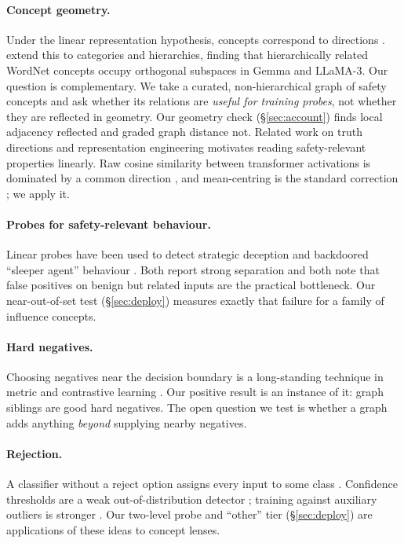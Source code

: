 \documentclass[11pt]{article}
\begin{document}
\paragraph{Concept geometry.} Under the linear representation hypothesis, concepts correspond to directions
\citep{park2024linear}. \citet{park2025hierarchical} extend this to categories and hierarchies, finding that
hierarchically related WordNet concepts occupy orthogonal subspaces in Gemma and LLaMA-3. Our question is
complementary. We take a curated, non-hierarchical graph of safety concepts and ask whether its relations are
\emph{useful for training probes}, not whether they are reflected in geometry. Our geometry check
(\S\ref{sec:account}) finds local adjacency reflected and graded graph distance not. Related work on truth
directions \citep{marks2023truth,burns2023ccs} and representation engineering \citep{zou2023repe} motivates
reading safety-relevant properties linearly. Raw cosine similarity between transformer activations is dominated
by a common direction \citep{ethayarajh2019contextual}, and mean-centring is the standard correction
\citep{mu2018allbutthetop}; we apply it.

\paragraph{Probes for safety-relevant behaviour.} Linear probes have been used to detect strategic deception
\citep{goldowskydill2025deception} and backdoored ``sleeper agent'' behaviour \citep{macdiarmid2024sleeper}. Both
report strong separation and both note that false positives on benign but related inputs are the practical
bottleneck. Our near-out-of-set test (\S\ref{sec:deploy}) measures exactly that failure for a family of
influence concepts.

\paragraph{Hard negatives.} Choosing negatives near the decision boundary is a long-standing technique in metric
and contrastive learning \citep{schroff2015facenet,kalantidis2020mixing,robinson2021hard}. Our positive result
is an instance of it: graph siblings are good hard negatives. The open question we test is whether a graph adds
anything \emph{beyond} supplying nearby negatives.

\paragraph{Rejection.} A classifier without a reject option assigns every input to some class
\citep{chow1970reject,geifman2017selective}. Confidence thresholds are a weak out-of-distribution detector
\citep{hendrycks2017baseline}; training against auxiliary outliers is stronger \citep{hendrycks2019oe}. Our
two-level probe and ``other'' tier (\S\ref{sec:deploy}) are applications of these ideas to concept lenses.
\end{document}
